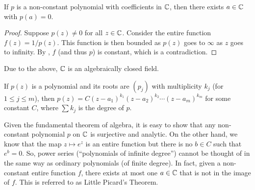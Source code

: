 	\begin{ftheo}
		If $p$ is a non-constant polynomial with coefficients in $\mathbb{C}$, then there exists $a \in \mathbb{C}$ with $p(a) = 0$.
	\end{ftheo}
	\begin{proof}
		Suppose $p(z) \ne 0$ for all $z \in \mathbb{C}$. Consider the entire function $f(z) = 1/p(z)$. This function is then bounded as $p(z)$ goes to $\infty$ as $z$ goes to infinity. By , $f$ (and thus $p$) is constant, which is a contradiction.
	\end{proof}

	Due to the above, $\mathbb{C}$ is an algebraically closed field.

	\begin{corollary}
		If $p(z)$ is a polynomial and its roots are $(p_j)$ with multiplicity $k_j$ (for $1\le j\le m$), then $p(z) = C (z-a_1)^{k_1} (z-a_2)^{k_2} \cdots (z-a_m)^{k_m}$ for some constant $C$, where $\sum k_j$ is the degree of $p$.
	\end{corollary}

	Given the fundamental theorem of algebra, it is easy to show that any non-constant polynomial $p$ on $\mathbb{C}$ is surjective and analytic. On the other hand, we know that the map  $z \mapsto e^z$ is an entire function but there is no $b \in C$ such that $e^b = 0$. So, power series (``polynomials of infinite degree'') cannot be thought of in the same way as ordinary polynomials (of finite degree). In fact, given a non-constant entire function $f$, there exists at most one $a \in \mathbb{C}$ that is not in the image of $f$. This is referred to as Little Picard's Theorem.

